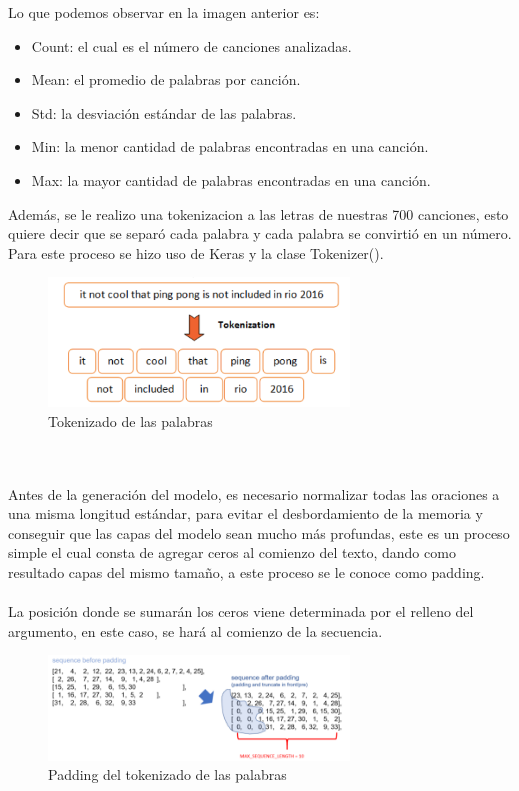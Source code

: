 Lo que podemos observar en la imagen anterior es:
\begin{itemize}
	\item Count: el cual es el número de canciones analizadas.
	\item Mean: el promedio de palabras por canción.
	\item Std: la desviación estándar de las palabras.
	\item Min: la menor cantidad de palabras encontradas en una canción.
	\item Max: la mayor cantidad de palabras encontradas en una canción.
\end{itemize}
Además, se le realizo una tokenizacion a las letras de nuestras 700 canciones, esto quiere decir que se separó cada palabra y cada palabra se convirtió en un número. Para este proceso se hizo uso de Keras y la clase Tokenizer().
\begin{figure}[h]
	\centering
	\includegraphics[width=8cm]{figuras/tokenization.png}
	\caption{Tokenizado de las palabras \cite{tokenimagen}}
	\label{fig:Tokenizado de las palabras}
\end{figure}
\\\\ Antes de la generación del modelo, es necesario normalizar todas las oraciones a una misma longitud estándar, para evitar el desbordamiento de la memoria y conseguir que las capas del modelo sean mucho más profundas, este es un proceso simple el cual consta de agregar ceros al comienzo del texto, dando como resultado capas del mismo tamaño, a este proceso se le conoce como padding.\\\\
La posición donde se sumarán los ceros viene determinada por el relleno del argumento, en este caso, se hará al comienzo de la secuencia.
\begin{figure}[h]
	\centering
	\includegraphics[width=8cm]{figuras/padding.png}
	\caption{Padding del tokenizado de las palabras}
	\label{fig:Padding del tokenizado de las palabras}
\end{figure}
